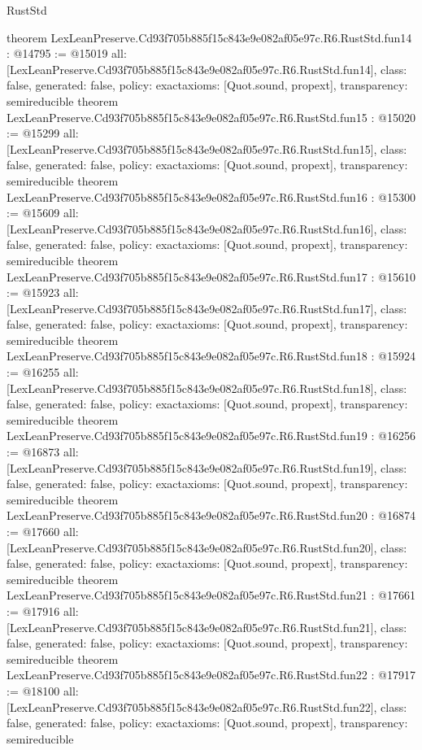\begin{lexlean}{RustStd}
\begin{coremodule}
{}
theorem LexLeanPreserve.Cd93f705b885f15c843e9e082af05e97c.R6.RustStd.fun14 : @14795 := @15019 {
  all: [LexLeanPreserve.Cd93f705b885f15c843e9e082af05e97c.R6.RustStd.fun14],
  class: false,
  generated: false,
  policy: exact{axioms: [Quot.sound, propext]},
  transparency: semireducible
}
theorem LexLeanPreserve.Cd93f705b885f15c843e9e082af05e97c.R6.RustStd.fun15 : @15020 := @15299 {
  all: [LexLeanPreserve.Cd93f705b885f15c843e9e082af05e97c.R6.RustStd.fun15],
  class: false,
  generated: false,
  policy: exact{axioms: [Quot.sound, propext]},
  transparency: semireducible
}
theorem LexLeanPreserve.Cd93f705b885f15c843e9e082af05e97c.R6.RustStd.fun16 : @15300 := @15609 {
  all: [LexLeanPreserve.Cd93f705b885f15c843e9e082af05e97c.R6.RustStd.fun16],
  class: false,
  generated: false,
  policy: exact{axioms: [Quot.sound, propext]},
  transparency: semireducible
}
theorem LexLeanPreserve.Cd93f705b885f15c843e9e082af05e97c.R6.RustStd.fun17 : @15610 := @15923 {
  all: [LexLeanPreserve.Cd93f705b885f15c843e9e082af05e97c.R6.RustStd.fun17],
  class: false,
  generated: false,
  policy: exact{axioms: [Quot.sound, propext]},
  transparency: semireducible
}
theorem LexLeanPreserve.Cd93f705b885f15c843e9e082af05e97c.R6.RustStd.fun18 : @15924 := @16255 {
  all: [LexLeanPreserve.Cd93f705b885f15c843e9e082af05e97c.R6.RustStd.fun18],
  class: false,
  generated: false,
  policy: exact{axioms: [Quot.sound, propext]},
  transparency: semireducible
}
theorem LexLeanPreserve.Cd93f705b885f15c843e9e082af05e97c.R6.RustStd.fun19 : @16256 := @16873 {
  all: [LexLeanPreserve.Cd93f705b885f15c843e9e082af05e97c.R6.RustStd.fun19],
  class: false,
  generated: false,
  policy: exact{axioms: [Quot.sound, propext]},
  transparency: semireducible
}
theorem LexLeanPreserve.Cd93f705b885f15c843e9e082af05e97c.R6.RustStd.fun20 : @16874 := @17660 {
  all: [LexLeanPreserve.Cd93f705b885f15c843e9e082af05e97c.R6.RustStd.fun20],
  class: false,
  generated: false,
  policy: exact{axioms: [Quot.sound, propext]},
  transparency: semireducible
}
theorem LexLeanPreserve.Cd93f705b885f15c843e9e082af05e97c.R6.RustStd.fun21 : @17661 := @17916 {
  all: [LexLeanPreserve.Cd93f705b885f15c843e9e082af05e97c.R6.RustStd.fun21],
  class: false,
  generated: false,
  policy: exact{axioms: [Quot.sound, propext]},
  transparency: semireducible
}
theorem LexLeanPreserve.Cd93f705b885f15c843e9e082af05e97c.R6.RustStd.fun22 : @17917 := @18100 {
  all: [LexLeanPreserve.Cd93f705b885f15c843e9e082af05e97c.R6.RustStd.fun22],
  class: false,
  generated: false,
  policy: exact{axioms: [Quot.sound, propext]},
  transparency: semireducible
}
\end{coremodule}
\end{lexlean}
